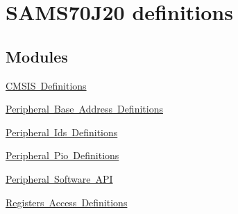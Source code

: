 \hypertarget{group__SAMS70J20__definitions}{}\section{S\+A\+M\+S70\+J20 definitions}
\label{group__SAMS70J20__definitions}
\subsection*{Modules}
\begin{DoxyCompactItemize}
\item 
\mbox{\hyperlink{group__SAMS70J20__cmsis}{C\+M\+S\+I\+S Definitions}}
\item 
\mbox{\hyperlink{group__SAMS70J20__base}{Peripheral Base Address Definitions}}
\item 
\mbox{\hyperlink{group__SAMS70J20__id}{Peripheral Ids Definitions}}
\item 
\mbox{\hyperlink{group__SAMS70J20__pio}{Peripheral Pio Definitions}}
\item 
\mbox{\hyperlink{group__SAMS70J20__api}{Peripheral Software A\+PI}}
\item 
\mbox{\hyperlink{group__SAMS70J20__reg}{Registers Access Definitions}}
\end{DoxyCompactItemize}
